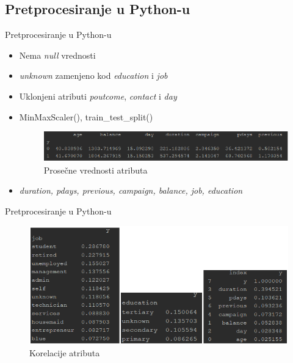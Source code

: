 \documentclass{beamer}
\begin{document}
\subsection{Pretprocesiranje u Python-u}
\begin{frame}{Pretprocesiranje u Python-u}
    	\begin{itemize}
		\item Nema \textit{null} vrednosti
		\item \textit{unknown} zamenjeno kod \textit{education} i \textit{job}		
		\item Uklonjeni atributi \textit{poutcome}, \textit{contact} i \textit{day}
		\item MinMaxScaler(), train\_test\_split()
		
		\begin{figure}[h!]
                \begin{center}
                \includegraphics[scale=0.70]{prosecne_vrednosti.png}
                \end{center}
                \caption{Prosečne vrednosti atributa}
                \label{fig:prosecne_vrednosti}
         \end{figure}
		
		\item \textit{duration, pdays, previous, campaign, balance, job, education}
	\end{itemize}	
\end{frame}

\begin{frame}{Pretprocesiranje u Python-u}
    	
		
		\begin{figure}[h!]
                \begin{center}
                \includegraphics[scale=0.50]{korelacije.png}
                \end{center}
                \caption{Korelacije atributa}
                \label{fig:korelacije}
         \end{figure}
		
			
\end{frame}
\end{document}
